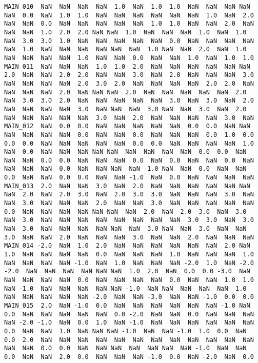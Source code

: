 \documentclass[a4paper,10pt,onecolumn,oneside,openright]{article}
\begin{document}
\begin{verbatim}
MAIN_010  NaN  NaN  NaN  NaN  1.0  NaN  1.0  1.0  NaN  NaN  NaN NaN  NaN  0.0  NaN  1.0  1.0  NaN  NaN  NaN  NaN  NaN  NaN  1.0  NaN  2.0  NaN  NaN  0.0  NaN  NaN  NaN  NaN  NaN  1.0  1.0  NaN  NaN  2.0  NaN  NaN  NaN  1.0  2.0  2.0 NaN NaN  1.0  NaN  NaN  NaN  1.0  NaN  1.0  NaN  3.0  3.0  1.0  NaN  NaN  NaN  NaN  NaN  0.0  NaN  NaN  NaN  NaN NaN  1.0  NaN  NaN  NaN  NaN NaN  NaN  1.0 NaN  NaN  2.0  NaN  1.0  NaN  NaN  NaN  NaN  1.0  NaN  NaN  0.0  NaN  NaN  1.0  NaN  1.0  1.0
MAIN_011  NaN  NaN  NaN  1.0  1.0  2.0  NaN  NaN  NaN  NaN  NaN NaN  2.0  NaN  NaN  2.0  2.0  NaN  NaN  3.0  NaN  2.0  NaN  NaN  NaN  3.0  NaN  NaN  NaN  NaN  2.0  3.0  2.0  NaN  NaN  NaN  NaN  2.0  2.0  NaN  NaN  NaN  NaN  2.0  NaN NaN NaN  2.0  NaN  NaN  NaN  NaN  NaN  2.0  NaN  3.0  3.0  2.0  NaN  NaN  NaN  NaN  NaN  3.0  NaN  3.0  NaN  2.0 NaN  NaN  NaN  NaN  3.0  NaN NaN  NaN  3.0 NaN  NaN  3.0  NaN  2.0  NaN  NaN  NaN  NaN  NaN  3.0  NaN  2.0  NaN  NaN  NaN  NaN  3.0  NaN
MAIN_012  NaN  0.0  0.0  NaN  NaN  NaN  NaN  NaN  0.0  0.0  NaN NaN  NaN  NaN  NaN  NaN  0.0  NaN  NaN  0.0  NaN  NaN  NaN  0.0  1.0  0.0  0.0  0.0  NaN  NaN  NaN  NaN  NaN  0.0  0.0  NaN  NaN  NaN  NaN  1.0  NaN  0.0  NaN  NaN  NaN NaN NaN  NaN  NaN  NaN  NaN  0.0  0.0  NaN  NaN  NaN  0.0  0.0  NaN  NaN  NaN  0.0  NaN  0.0  NaN  NaN  0.0  NaN NaN  NaN  NaN  0.0  NaN  NaN NaN  NaN -1.0 NaN  NaN  0.0  NaN  NaN  0.0  NaN  NaN  0.0  0.0  NaN  NaN -1.0  NaN  0.0  NaN  NaN  NaN  NaN
MAIN_013  2.0  NaN  NaN  3.0  NaN  2.0  NaN  NaN  NaN  NaN  NaN NaN  NaN  2.0  NaN  2.0  3.0  NaN  2.0  3.0  3.0  NaN  NaN  NaN  3.0  NaN  NaN  3.0  NaN  NaN  NaN  2.0  NaN  NaN  3.0  NaN  NaN  NaN  NaN  NaN  0.0  NaN  NaN  NaN  NaN NaN NaN  NaN  2.0  NaN  2.0  3.0  NaN  3.0  NaN  3.0  NaN  NaN  NaN  NaN  NaN  NaN  NaN  NaN  3.0  3.0  NaN  3.0 NaN  3.0  NaN  NaN  NaN  NaN NaN  NaN  3.0 NaN  NaN  3.0  NaN  NaN  3.0  NaN  NaN  2.0  NaN  NaN  NaN  3.0  NaN  NaN  2.0  NaN  NaN  NaN
MAIN_014 -2.0  NaN  1.0  2.0  NaN  NaN  NaN  NaN  NaN  NaN  2.0 NaN  1.0  NaN  NaN  NaN  NaN  0.0  NaN  NaN  NaN  1.0  NaN  NaN  NaN  1.0  NaN  NaN  NaN  NaN -1.0  NaN  1.0  NaN  NaN  NaN -2.0  1.0  NaN -2.0 -2.0  NaN  NaN  NaN  NaN NaN NaN  1.0  2.0  NaN  0.0  0.0 -3.0  NaN  NaN  NaN  NaN  NaN  0.0  NaN  NaN  NaN  NaN  0.0  NaN  NaN  1.0  1.0 NaN -1.0  NaN  NaN  NaN  NaN NaN -1.0  NaN NaN  NaN  NaN  NaN  1.0  NaN  NaN  NaN  NaN  NaN -2.0  NaN  NaN -3.0  NaN  NaN -1.0  0.0  0.0
MAIN_015  2.0  NaN -1.0  0.0  NaN  NaN  NaN  NaN  NaN  NaN -1.0 NaN  0.0  NaN  NaN  NaN  NaN  NaN  0.0 -2.0  NaN  NaN  0.0  NaN  NaN  NaN  NaN -2.0 -1.0  NaN  0.0  1.0  NaN -1.0  NaN  NaN  NaN  NaN  NaN  NaN  0.0  NaN  NaN  1.0  NaN NaN NaN -1.0  NaN  NaN -1.0  1.0  0.0  NaN  0.0  2.0  NaN  NaN  NaN  NaN  NaN  NaN  NaN  NaN  NaN  NaN  NaN  NaN NaN  NaN  0.0  0.0  NaN  NaN NaN  NaN  NaN NaN  NaN -1.0  NaN  NaN  0.0  NaN  NaN  2.0  0.0  NaN  NaN  NaN -1.0  0.0  NaN -2.0  NaN  0.0

\end{verbatim}
\end{document}
